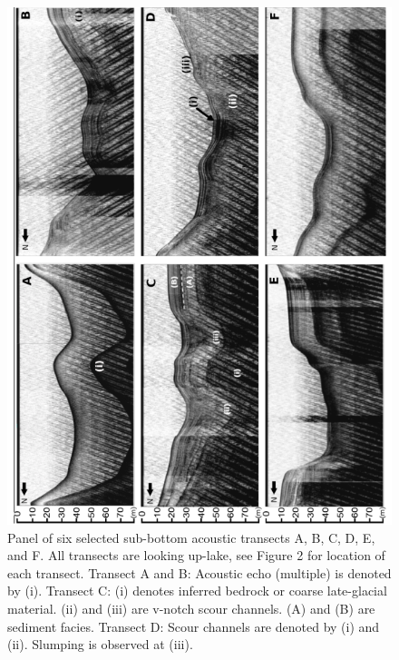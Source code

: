 \documentclass[Royal,times,doublespace,sageh]{sagej}
\begin{document}
\begin{figure}

{\centering \includegraphics[width=1\linewidth]{../figs/acoustics/acoustics_6_panel} 

}

\caption{Panel of six selected sub-bottom acoustic transects A, B, C, D, E, and F. All transects are looking up-lake, see Figure 2 for location of each transect. Transect A and B: Acoustic echo (multiple) is denoted by (i). Transect C: (i) denotes inferred bedrock or coarse late-glacial material. (ii) and (iii) are v-notch scour channels. (A) and (B) are sediment facies. Transect D: Scour channels are denoted by (i) and (ii). Slumping is observed at (iii).}\label{fig:acoustics}
\end{figure}
\end{document}
